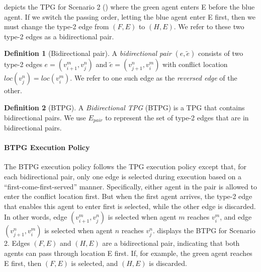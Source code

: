 \documentclass[letterpaper]{article} %
\theoremstyle{definition}
\newtheorem{definition}{Definition}
\newcommand{\rishi}[1]{\textcolor{black}{\textbf{Rishi:}}
\textcolor{purple}{#1}}
\begin{document}
 depicts the TPG for Scenario 2 () where the green agent enters E before the blue agent. If we switch the passing order, letting the blue agent enter E first, then we must change the type-2 edge from $(F, E)$ to $(H, E)$. We refer to these two type-2 edges as a bidirectional pair.
\begin{definition}[Bidirectional pair]
\label{def: bType2}
A \emph{bidirectional pair} $(e, \tilde{e})$ consists of two type-2 edges $e = (v_{i+1}^m, v_{j}^n)$ and $\tilde{e} = (v_{j+1}^n, v_{i}^m)$ with conflict location $loc(v_{j}^n) = loc(v_{i}^m)$. We refer to one such edge as the \emph{reversed edge} of the other. %
\end{definition}
\begin{definition}[BTPG]
\label{def:BTPG}
    A \emph{Bidirectional TPG} (BTPG) is a TPG that contains bidirectional pairs. We use $E_{pair}$ to represent the set of type-2 edges that are in bidirectional pairs.
\end{definition}

\paragraph{BTPG Execution Policy}
The BTPG execution policy follows the TPG execution policy except that, for each bidirectional pair, only one edge is selected during execution based on a ``first-come-first-served'' manner. Specifically, either agent in the pair is allowed to enter the conflict location first. But when the first agent arrives, the type-2 edge that enables this agent to enter first is selected, while the other edge is discarded. In other words, edge $(v_{i+1}^m, v_j^n)$ is selected when agent $m$ reaches $v_i^m$, and edge $(v_{j+1}^n, v_{i}^m)$ is selected when agent $n$ reaches $v_j^n$.
 displays the BTPG for Scenario 2.
Edges $(F,E)$ and $(H,E)$ are a bidirectional pair, indicating that both agents can pass through location E first. If, for example, the green agent reaches E first, then $(F,E)$ is selected, and $(H,E)$ is discarded.
\end{document}
